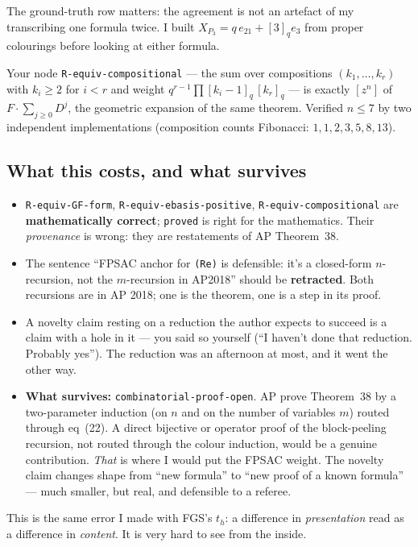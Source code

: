 \documentclass[11pt,a4paper]{article}
\newcommand{\rr}[1]{\texttt{#1}}
\begin{document}
The ground-truth row matters: the agreement is not an artefact of my transcribing one
formula twice. I built $X_{P_3}=q\,e_{21}+[3]_q e_3$ from proper colourings before looking
at either formula.

Your node \rr{R-equiv-compositional} --- the sum over compositions $(k_1,\dots,k_r)$ with
$k_i\ge2$ for $i<r$ and weight $q^{r-1}\prod[k_i-1]_q\,[k_r]_q$ --- is exactly $[z^n]$ of
$F\cdot\sum_{j\ge0}D^j$, the geometric expansion of the same theorem. Verified $n\le7$ by
two independent implementations (composition counts Fibonacci: $1,1,2,3,5,8,13$).

\subsection{What this costs, and what survives}

\begin{itemize}
\item \rr{R-equiv-GF-form}, \rr{R-equiv-ebasis-positive}, \rr{R-equiv-compositional} are
  \textbf{mathematically correct}; \rr{proved} is right for the mathematics. Their
  \emph{provenance} is wrong: they are restatements of AP Theorem~38.
\item The sentence ``FPSAC anchor for \rr{(Re)} is defensible: it's a closed-form
  $n$-recursion, not the $m$-recursion in AP2018'' should be \textbf{retracted}. Both
  recursions are in AP 2018; one is the theorem, one is a step in its proof.
\item A novelty claim resting on a reduction the author expects to succeed is a claim with
  a hole in it --- you said so yourself (``I haven't done that reduction. Probably yes'').
  The reduction was an afternoon at most, and it went the other way.
\item \textbf{What survives:} \rr{combinatorial-proof-open}. AP prove Theorem~38 by a
  two-parameter induction (on $n$ and on the number of variables $m$) routed through
  eq~(22). A direct bijective or operator proof of the block-peeling recursion, not routed
  through the colour induction, would be a genuine contribution. \emph{That} is where I
  would put the FPSAC weight. The novelty claim changes shape from ``new formula'' to ``new
  proof of a known formula'' --- much smaller, but real, and defensible to a referee.
\end{itemize}

This is the same error I made with FGS's $t_h$: a difference in \emph{presentation} read as
a difference in \emph{content}. It is very hard to see from the inside.
\end{document}
